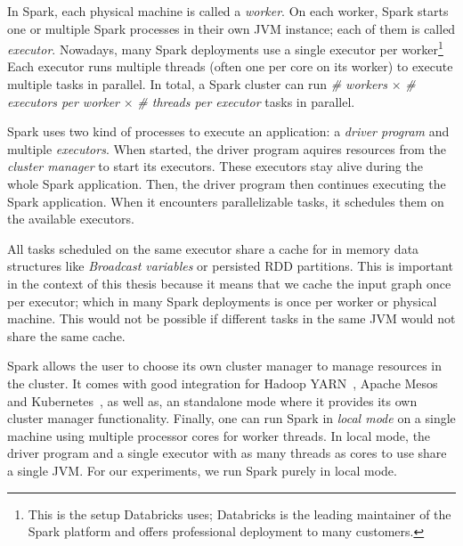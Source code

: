 In Spark, each physical machine is called a \textit{worker}.
On each worker, Spark starts one or multiple Spark processes in their own JVM instance; each of them is called \textit{executor}.
Nowadays, many Spark deployments use a single executor per worker\footnote{This is the setup Databricks uses; Databricks is the leading
maintainer of the Spark platform and offers professional deployment to many customers.}
Each executor runs multiple threads (often one per core on its worker) to execute multiple tasks in parallel.
In total, a Spark cluster can run \textit{\# workers} $\times$ \textit{\# executors per worker} $\times$ \textit{\# threads per executor} tasks
in parallel.

Spark uses two kind of processes to execute an application: a \textit{driver program} and multiple \textit{executors}.
When started, the driver program aquires resources from the \textit{cluster manager} to start its executors.
These executors stay alive during the whole Spark application.
Then, the driver program then continues executing the Spark application.
When it encounters parallelizable tasks, it schedules them on the available executors.

All tasks scheduled on the same executor share a cache for in memory data structures like \textit{Broadcast variables} or persisted RDD
partitions.
This is important in the context of this thesis because it means that we cache the input graph once per executor;
which in many Spark deployments is once per worker or physical machine.
This would not be possible if different tasks in the same JVM would not share the same cache.

Spark allows the user to choose its own cluster manager to manage resources in the cluster.
It comes with good integration for Hadoop YARN~\cite{yarn}, Apache Mesos~\cite{mesos} and Kubernetes~\cite{kubernetes}, as well as,
an standalone mode where it provides its own cluster manager functionality.
Finally, one can run Spark in \textit{local mode} on a single machine using multiple processor cores for worker threads.
In local mode, the driver program and a single executor with as many threads as cores to use share a single JVM.
For our experiments, we run Spark purely in local mode.

